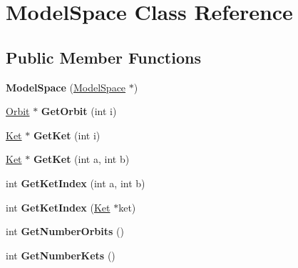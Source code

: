 \hypertarget{classModelSpace}{\section{Model\-Space Class Reference}
\label{classModelSpace}
}
\subsection*{Public Member Functions}
\begin{DoxyCompactItemize}
\item 
\hypertarget{classModelSpace_ace83628e3da0b44ae53f1548e84341a0}{{\bfseries Model\-Space} (\hyperlink{classModelSpace}{Model\-Space} $\ast$)}\label{classModelSpace_ace83628e3da0b44ae53f1548e84341a0}

\item 
\hypertarget{classModelSpace_af76b8aad86c7ebc938f81c48e46039b5}{\hyperlink{classOrbit}{Orbit} $\ast$ {\bfseries Get\-Orbit} (int i)}\label{classModelSpace_af76b8aad86c7ebc938f81c48e46039b5}

\item 
\hypertarget{classModelSpace_a72c2d4577e009a4ca8b771ad7416606b}{\hyperlink{classKet}{Ket} $\ast$ {\bfseries Get\-Ket} (int i)}\label{classModelSpace_a72c2d4577e009a4ca8b771ad7416606b}

\item 
\hypertarget{classModelSpace_a863d40e24681c22ce59869027cb907f9}{\hyperlink{classKet}{Ket} $\ast$ {\bfseries Get\-Ket} (int a, int b)}\label{classModelSpace_a863d40e24681c22ce59869027cb907f9}

\item 
\hypertarget{classModelSpace_a1dc25c23564b3f768eff5c49692d5896}{int {\bfseries Get\-Ket\-Index} (int a, int b)}\label{classModelSpace_a1dc25c23564b3f768eff5c49692d5896}

\item 
\hypertarget{classModelSpace_a4e62ad9bd7f2c6f0bdbed31b15c53d57}{int {\bfseries Get\-Ket\-Index} (\hyperlink{classKet}{Ket} $\ast$ket)}\label{classModelSpace_a4e62ad9bd7f2c6f0bdbed31b15c53d57}

\item 
\hypertarget{classModelSpace_a28c975e3a9ac7c6234b7fb11d7ddf313}{int {\bfseries Get\-Number\-Orbits} ()}\label{classModelSpace_a28c975e3a9ac7c6234b7fb11d7ddf313}

\item 
\hypertarget{classModelSpace_ae4c39da727df33111c134c0db6c41f89}{int {\bfseries Get\-Number\-Kets} ()}\label{classModelSpace_ae4c39da727df33111c134c0db6c41f89}


\end{DoxyCompactItemize}
